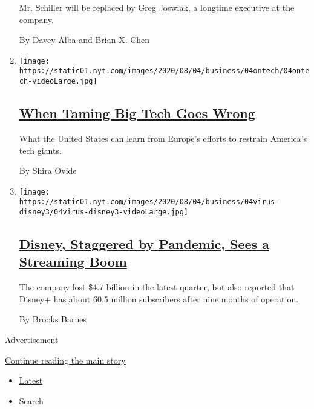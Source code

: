 \begin{enumerate}
  Mr. Schiller will be replaced by Greg Joswiak, a longtime executive at
  the company.

  By Davey Alba and Brian X. Chen
\item
  \texttt{[image: https://static01.nyt.com/images/2020/08/04/business/04ontech/04ontech-videoLarge.jpg]}

  \hypertarget{when-taming-big-tech-goes-wrong}{%
  \subsection{\texorpdfstring{\href{/2020/08/04/technology/europe-big-tech.html}{When
  Taming Big Tech Goes
  Wrong}}{When Taming Big Tech Goes Wrong}}\label{when-taming-big-tech-goes-wrong}}

  What the United States can learn from Europe's efforts to restrain
  America's tech giants.

  By Shira Ovide
\item
  \texttt{[image: https://static01.nyt.com/images/2020/08/04/business/04virus-disney3/04virus-disney3-videoLarge.jpg]}

  \hypertarget{disney-staggered-by-pandemic-sees-a-streaming-boom}{%
  \subsection{\texorpdfstring{\href{/2020/08/04/business/media/disney-earnings-coronavirus.html}{Disney,
  Staggered by Pandemic, Sees a Streaming
  Boom}}{Disney, Staggered by Pandemic, Sees a Streaming Boom}}\label{disney-staggered-by-pandemic-sees-a-streaming-boom}}

  The company lost \$4.7 billion in the latest quarter, but also
  reported that Disney+ has about 60.5 million subscribers after nine
  months of operation.

  By Brooks Barnes
\end{enumerate}

Advertisement

\protect\hyperlink{after-mid2}{Continue reading the main story}

\begin{itemize}
\tightlist
\item
  \protect\hyperlink{stream-panel}{Latest}
\item
  Search
\end{itemize}

